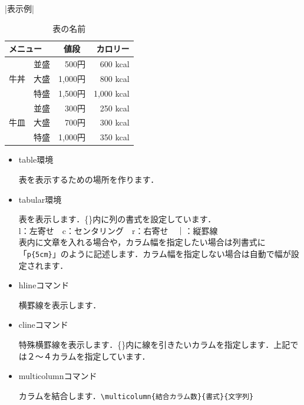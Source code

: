|表示例|
    \begin{table}[!h]
    \begin{center}
    \caption{表の名前}
    \label{fig:表の名前}
    \begin{tabular}{|l|c|r||r|}
    \hline
            \multicolumn{2}{|Y|}{メニュー} & \multicolumn{1}{c||}{値段} & \multicolumn{1}{p{8zw}|}{カロリー}\\ \hline \hline
             & 並盛 & 500円 & 600 kcal \\ \cline{2-4}
            牛丼 & 大盛 & 1,000円 & 800 kcal \\ \cline{2-4}
             & 特盛 & 1,500円 & 1,000 kcal \\ \hline
             & 並盛 & 300円 & 250 kcal \\ \cline{2-4}
            牛皿 & 大盛 & 700円 & 300 kcal \\ \cline{2-4}
             & 特盛 & 1,000円 & 350 kcal \\ \hline
    \end{tabular}
    \end{center}
    \end{table}
    \begin{itemize}
    \item table環境

    表を表示するための場所を作ります．
       \item tabular環境

       表を表示します．\{\}内に列の書式を設定しています．\\
    l：左寄せ　c：センタリング　r：右寄せ　｜：縦罫線\\
    表内に文章を入れる場合や，カラム幅を指定したい場合は列書式に「\verb|p{5cm}|」のように記述します．カラム幅を指定しない場合は自動で幅が設定されます．
    \item hlineコマンド

    横罫線を表示します．
    \item clineコマンド

    特殊横罫線を表示します．\{\}内に線を引きたいカラムを指定します．上記では２～４カラムを指定しています．
    \item multicolumnコマンド

    カラムを結合します．\verb|\multicolumn{結合カラム数}{書式}{文字列}|
    \end{itemize}

